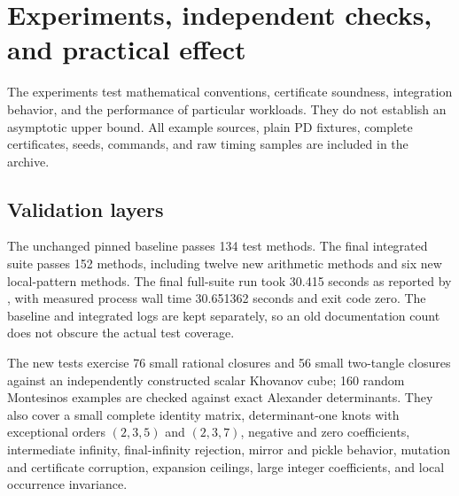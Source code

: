 \documentclass[11pt,a4paper]{article}
\theoremstyle{definition}
\theoremstyle{remark}
\newcommand{\code}[1]{\texttt{\detokenize{#1}}}
\numberwithin{equation}{section}
\begin{document}
\section{Experiments, independent checks, and practical effect}
\label{sec:experiments}

The experiments test mathematical conventions, certificate soundness,
integration behavior, and the performance of particular workloads.
They do not establish an asymptotic upper bound. All example sources,
plain PD fixtures, complete certificates, seeds, commands, and raw
timing samples are included in the archive.

\subsection{Validation layers}

The unchanged pinned baseline passes 134 test methods. The final integrated
suite passes 152 methods, including twelve new arithmetic methods and
six new local-pattern methods. The final full-suite run took 30.415 seconds
as reported by \code{unittest}, with measured process wall time
30.651362 seconds and exit code zero. The baseline and integrated logs
are kept separately, so an old documentation count does not obscure the
actual test coverage.

The new tests exercise 76 small rational closures and 56 small two-tangle
closures against an independently constructed scalar Khovanov cube;
160 random Montesinos examples are checked against exact Alexander
determinants. They also cover a small complete identity matrix,
determinant-one knots with exceptional orders \((2,3,5)\) and
\((2,3,7)\), negative and zero coefficients, intermediate infinity,
final-infinity rejection, mirror and pickle behavior, mutation and
certificate corruption, expansion ceilings, large integer coefficients,
and local occurrence invariance.
\end{document}

